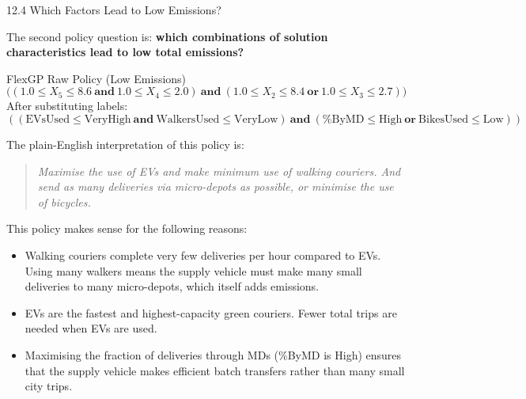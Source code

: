 \documentclass[aspectratio=169,10pt]{beamer}
\begin{document}
\begin{frame}[allowframebreaks]{12.4 Which Factors Lead to Low Emissions?}

The second policy question is:
\textbf{which combinations of solution characteristics lead to
low total emissions?}

\medskip

\begin{block}{FlexGP Raw Policy (Low Emissions)}
  \[
    \bigl((1.0 \le X_5 \le 8.6\ \mathbf{and}\ 1.0 \le X_4 \le 2.0)\
    \mathbf{and}\ (1.0 \le X_2 \le 8.4\ \mathbf{or}\ 1.0 \le X_3 \le 2.7)\bigr)
  \]
  After substituting labels:
  \[
    ((\text{EVsUsed} \le \text{VeryHigh}\
    \mathbf{and}\ \text{WalkersUsed} \le \text{VeryLow})\
    \mathbf{and}\
    (\%\text{ByMD} \le \text{High}\ \mathbf{or}\ \text{BikesUsed} \le \text{Low}))
  \]
\end{block}

\medskip

The plain-English interpretation of this policy is:
\begin{quote}
  \emph{Maximise the use of EVs and make minimum use of walking couriers.
  And send as many deliveries via micro-depots as possible,
  or minimise the use of bicycles.}
\end{quote}

\medskip

This policy makes sense for the following reasons:

\begin{itemize}
  \item Walking couriers complete very few deliveries per hour
        compared to EVs. Using many walkers means the supply vehicle
        must make many small deliveries to many micro-depots,
        which itself adds emissions.
  \item EVs are the fastest and highest-capacity green couriers.
        Fewer total trips are needed when EVs are used.
  \item Maximising the fraction of deliveries through MDs
        (\%ByMD is High) ensures that the supply vehicle
        makes efficient batch transfers rather than many small city trips.
\end{itemize}

\end{frame}
\end{document}
